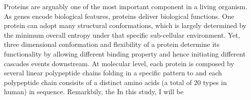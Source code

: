 Proteins are arguably one of the most important component in a living organism. As genes encode biological features, proteins deliver biological functions. One protein can adopt many structural conformations, which is largely determined by the minimum overall entropy under that specific sub-cellular environment. Yet, three dimensional conformation and flexibility of a protein determine its functionality by allowing different binding property and hence initiating different cascades events downstream. At molecular level, each protein is composed by several linear polypeptide chains folding in a specific pattern to  and each polypeptide chain consisits of a distinct amino acids (a total of 20 types in human) in sequence. Remarkbily, the  In this study, I will be 